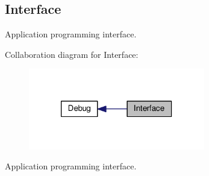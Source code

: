 \hypertarget{group__dbg__intf}{\subsection{Interface}
\label{group__dbg__intf}
}


Application programming interface.  


Collaboration diagram for Interface\-:\nopagebreak
\begin{figure}[H]
\begin{center}
\leavevmode
\includegraphics[width=218pt]{group__dbg__intf}
\end{center}
\end{figure}
Application programming interface. 